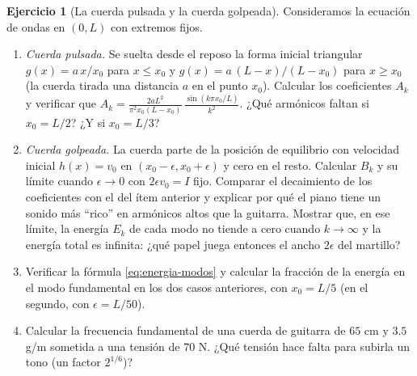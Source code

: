 \documentclass[12pt, a4paper]{amsbook}
\theoremstyle{remark}
\theoremstyle{definition}
\newtheorem{ejer}[teo]{Ejercicio}
\numberwithin{section}{chapter}
\numberwithin{subsection}{section}
\numberwithin{equation}{section}
\numberwithin{figure}{chapter}
\begin{document}
\begin{ejer}[La cuerda pulsada y la cuerda golpeada]\label{ejer:cuerda-guiado}
Consideramos la ecuación de ondas en $(0,L)$ con extremos fijos.
\begin{enumerate}
\item \emph{Cuerda pulsada.} Se suelta desde el reposo la forma inicial triangular $g(x) = a\,x/x_0$ para $x\le x_0$ y $g(x) = a\,(L-x)/(L-x_0)$ para $x\ge x_0$ (la cuerda tirada una distancia $a$ en el punto $x_0$). Calcular los coeficientes $A_k$ y verificar que $A_k = \frac{2aL^2}{\pi^2 x_0(L-x_0)}\,\frac{\sin(k\pi x_0/L)}{k^2}$. ¿Qué armónicos faltan si $x_0 = L/2$? ¿Y si $x_0=L/3$?
\item \emph{Cuerda golpeada.} La cuerda parte de la posición de equilibrio con velocidad inicial $h(x) = v_0$ en $(x_0-\epsilon,x_0+\epsilon)$ y cero en el resto. Calcular $B_k$ y su límite cuando $\epsilon\to 0$ con $2\epsilon v_0 = I$ fijo. Comparar el decaimiento de los coeficientes con el del ítem anterior y explicar por qué el piano tiene un sonido más ``rico'' en armónicos altos que la guitarra. Mostrar que, en ese límite, la energía $E_k$ de cada modo no tiende a cero cuando $k\to\infty$ y la energía total es infinita: ¿qué papel juega entonces el ancho $2\epsilon$ del martillo?
\item Verificar la fórmula \eqref{eq:energia-modos} y calcular la fracción de la energía en el modo fundamental en los dos casos anteriores, con $x_0 = L/5$ (en el segundo, con $\epsilon=L/50$).
\item Calcular la frecuencia fundamental de una cuerda de guitarra de $65$ cm y $3.5$ g/m sometida a una tensión de $70$ N. ¿Qué tensión hace falta para subirla un tono (un factor $2^{1/6}$)?
\end{enumerate}
\end{ejer}
\end{document}
